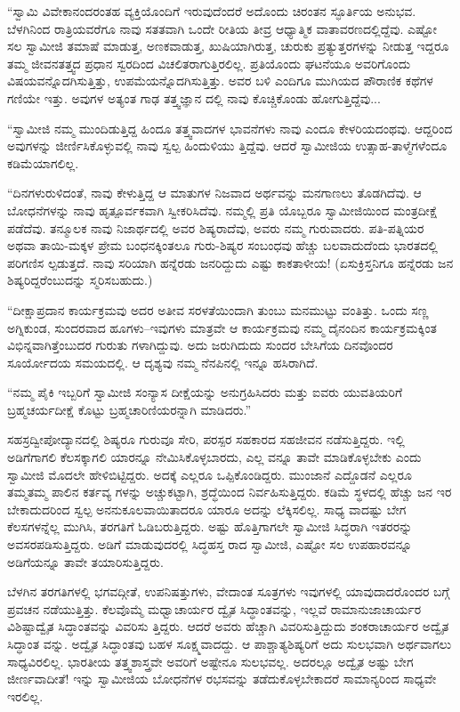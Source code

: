 “ಸ್ವಾಮಿ ವಿವೇಕಾನಂದರಂತಹ ವ್ಯಕ್ತಿಯೊಂದಿಗೆ ಇರುವುದೆಂದರೆ ಅದೊಂದು ಚಿರಂತನ ಸ್ಫೂರ್ತಿಯ ಅನುಭವ. ಬೆಳಗಿನಿಂದ ರಾತ್ರಿಯವರೆಗೂ ನಾವು ಸತತವಾಗಿ ಒಂದೇ ರೀತಿಯ ತೀವ್ರ ಆಧ್ಯಾತ್ಮಿಕ ವಾತಾವರಣದಲ್ಲಿದ್ದೆವು. ಎಷ್ಟೋ ಸಲ ಸ್ವಾಮೀಜಿ ತಮಾಷೆ ಮಾಡುತ್ತ, ಅಣಕವಾಡುತ್ತ, ಖುಷಿಯಾಗಿರುತ್ತ, ಚುರುಕು ಪ್ರತ್ಯುತ್ತರಗಳನ್ನು ನೀಡುತ್ತ ಇದ್ದರೂ ತಮ್ಮ ಜೀವನತತ್ತ್ವದ ಪ್ರಧಾನ ಸ್ವರದಿಂದ ವಿಚಲಿತರಾಗುತ್ತಿರಲಿಲ್ಲ. ಪ್ರತಿಯೊಂದು ಘಟನೆಯೂ ಅವರಿಗೊಂದು ವಿಷಯವನ್ನೊದಗಿಸುತ್ತಿತ್ತು, ಉಪಮೆಯನ್ನೊದಗಿಸುತ್ತಿತ್ತು. ಅವರ ಬಳಿ ಎಂದಿಗೂ ಮುಗಿಯದ ಪೌರಾಣಿಕ ಕಥೆಗಳ ಗಣಿಯೇ ಇತ್ತು. ಅವುಗಳ ಅತ್ಯಂತ ಗಾಢ ತತ್ತ್ವಜ್ಞಾನ ದಲ್ಲಿ ನಾವು ಕೊಚ್ಚಿಕೊಂಡು ಹೋಗುತ್ತಿದ್ದೆವು... 

“ಸ್ವಾಮೀಜಿ ನಮ್ಮ ಮುಂದಿಡುತ್ತಿದ್ದ ಹಿಂದೂ ತತ್ತ್ವವಾದಗಳ ಭಾವನೆಗಳು ನಾವು ಎಂದೂ ಕೇಳರಿಯದಂಥವು. ಆದ್ದರಿಂದ ಅವುಗಳನ್ನು ಜೀರ್ಣಿಸಿಕೊಳ್ಳುವಲ್ಲಿ ನಾವು ಸ್ವಲ್ಪ ಹಿಂದುಳಿಯು ತ್ತಿದ್ದೆವು. ಆದರೆ ಸ್ವಾಮೀಜಿಯ ಉತ್ಸಾಹ-ತಾಳ್ಮೆಗಳೆಂದೂ ಕಡಿಮೆಯಾಗಲಿಲ್ಲ.

“ದಿನಗಳುರುಳಿದಂತೆ, ನಾವು ಕೇಳುತ್ತಿದ್ದ ಆ ಮಾತುಗಳ ನಿಜವಾದ ಅರ್ಥವನ್ನು ಮನಗಾಣಲು ತೊಡಗಿದೆವು. ಆ ಬೋಧನೆಗಳನ್ನು ನಾವು ಹೃತ್ಪೂರ್ವಕವಾಗಿ ಸ್ವೀಕರಿಸಿದೆವು. ನಮ್ಮಲ್ಲಿ ಪ್ರತಿ ಯೊಬ್ಬರೂ ಸ್ವಾಮೀಜಿಯಿಂದ ಮಂತ್ರದೀಕ್ಷೆ ಪಡೆದೆವು. ತನ್ಮೂಲಕ ನಾವು ನಿಜಾರ್ಥದಲ್ಲಿ ಅವರ ಶಿಷ್ಯರಾದೆವು, ಅವರು ನಮ್ಮ ಗುರುವಾದರು. ಪತಿ-ಪತ್ನಿಯರ ಅಥವಾ ತಾಯಿ-ಮಕ್ಕಳ ಪ್ರೇಮ ಬಂಧನಕ್ಕಿಂತಲೂ ಗುರು-ಶಿಷ್ಯರ ಸಂಬಂಧವು ಹೆಚ್ಚು ಬಲವಾದುದೆಂದು ಭಾರತದಲ್ಲಿ ಪರಿಗಣಿಸ ಲ್ಪಡುತ್ತದೆ. ನಾವು ಸರಿಯಾಗಿ ಹನ್ನೆರಡು ಜನರಿದ್ದುದು ಎಷ್ಟು ಕಾಕತಾಳೀಯ! (ಏಸುಕ್ರಿಸ್ತನಿಗೂ ಹನ್ನೆರಡು ಜನ ಶಿಷ್ಯರಿದ್ದರೆಂಬುದನ್ನು ಸ್ಮರಿಸಬಹುದು.)

“ದೀಕ್ಷಾಪ್ರದಾನ ಕಾರ್ಯಕ್ರಮವು ಅದರ ಅತೀವ ಸರಳತೆಯಿಂದಾಗಿ ತುಂಬು ಮನಮುಟ್ಟು ವಂತಿತ್ತು. ಒಂದು ಸಣ್ಣ ಅಗ್ನಿಕುಂಡ, ಸುಂದರವಾದ ಹೂಗಳು–ಇವುಗಳು ಮಾತ್ರವೇ ಆ ಕಾರ್ಯಕ್ರಮವು ನಮ್ಮ ದೈನಂದಿನ ಕಾರ್ಯಕ್ರಮಕ್ಕಿಂತ ವಿಭಿನ್ನವಾಗಿತ್ತೆಂಬುದರ ಗುರುತು ಗಳಾಗಿದ್ದುವು. ಅದು ಜರುಗಿದುದು ಸುಂದರ ಬೇಸಿಗೆಯ ದಿನವೊಂದರ ಸೂರ್ಯೋದಯ ಸಮಯದಲ್ಲಿ. ಆ ದೃಶ್ಯವು ನಮ್ಮ ನೆನಪಿನಲ್ಲಿ ಇನ್ನೂ ಹಸಿರಾಗಿದೆ.

“ನಮ್ಮ ಪೈಕಿ ಇಬ್ಬರಿಗೆ ಸ್ವಾಮೀಜಿ ಸಂನ್ಯಾಸ ದೀಕ್ಷೆಯನ್ನು ಅನುಗ್ರಹಿಸಿದರು ಮತ್ತು ಐವರು ಯುವತಿಯರಿಗೆ ಬ್ರಹ್ಮಚರ್ಯದೀಕ್ಷೆ ಕೊಟ್ಟು ಬ್ರಹ್ಮಚಾರಿಣಿಯರನ್ನಾಗಿ ಮಾಡಿದರು.”

ಸಹಸ್ರದ್ವೀಪೋದ್ಯಾನದಲ್ಲಿ ಶಿಷ್ಯರೂ ಗುರುವೂ ಸೇರಿ, ಪರಸ್ಪರ ಸಹಕಾರದ ಸಹಜೀವನ ನಡೆಸುತ್ತಿದ್ದರು. ಇಲ್ಲಿ ಅಡಿಗೆಗಾಗಲಿ ಕೆಲಸಕ್ಕಾಗಲಿ ಯಾರನ್ನೂ ನೇಮಿಸಿಕೊಳ್ಳಬಾರದು, ಎಲ್ಲ ವನ್ನೂ ತಾವೇ ಮಾಡಿಕೊಳ್ಳಬೇಕು ಎಂದು ಸ್ವಾಮೀಜಿ ಮೊದಲೇ ಹೇಳಿಬಿಟ್ಟಿದ್ದರು. ಅದಕ್ಕೆ ಎಲ್ಲರೂ ಒಪ್ಪಿಕೊಂಡಿದ್ದರು. ಮುಂಜಾನೆ ಎದ್ದೊಡನೆ ಎಲ್ಲರೂ ತಮ್ಮತಮ್ಮ ಪಾಲಿನ ಕರ್ತವ್ಯ ಗಳನ್ನು ಅಚ್ಚುಕಟ್ಟಾಗಿ, ಶ್ರದ್ಧೆಯಿಂದ ನಿರ್ವಹಿಸುತ್ತಿದ್ದರು. ಕಡಿಮೆ ಸ್ಥಳದಲ್ಲಿ ಹೆಚ್ಚು ಜನ ಇರ ಬೇಕಾದುದರಿಂದ ಸ್ವಲ್ಪ ಅನನುಕೂಲವಾಯಿತಾದರೂ ಯಾರೂ ಅದನ್ನು ಲೆಕ್ಕಿಸಲಿಲ್ಲ. ಸಾಧ್ಯ ವಾದಷ್ಟು ಬೇಗ ಕೆಲಸಗಳನ್ನೆಲ್ಲ ಮುಗಿಸಿ, ತರಗತಿಗೆ ಓಡಿಬರುತ್ತಿದ್ದರು. ಅಷ್ಟು ಹೊತ್ತಿಗಾಗಲೇ ಸ್ವಾಮೀಜಿ ಸಿದ್ಧರಾಗಿ ಇತರರನ್ನು ಅವಸರಪಡಿಸುತ್ತಿದ್ದರು. ಅಡಿಗೆ ಮಾಡುವುದರಲ್ಲಿ ಸಿದ್ಧಹಸ್ತ ರಾದ ಸ್ವಾಮೀಜಿ, ಎಷ್ಟೋ ಸಲ ಉಪಹಾರವನ್ನೂ ಅಡಿಗೆಯನ್ನೂ ತಾವೇ ತಯಾರಿಸುತ್ತಿದ್ದರು.

ಬೆಳಗಿನ ತರಗತಿಗಳಲ್ಲಿ ಭಗವದ್ಗೀತೆ, ಉಪನಿಷತ್ತುಗಳು, ವೇದಾಂತ ಸೂತ್ರಗಳು ಇವುಗಳಲ್ಲಿ ಯಾವುದಾದರೊಂದರ ಬಗ್ಗೆ ಪ್ರವಚನ ನಡೆಯುತ್ತಿತ್ತು. ಕೆಲವೊಮ್ಮೆ ಮಧ್ವಾಚಾರ್ಯರ ದ್ವೈತ ಸಿದ್ಧಾಂತವನ್ನು, ಇಲ್ಲವೆ ರಾಮಾನುಜಾಚಾರ್ಯರ ವಿಶಿಷ್ಟಾದ್ವೈತ ಸಿದ್ಧಾಂತವನ್ನು ವಿವರಿಸು ತ್ತಿದ್ದರು. ಆದರೆ ಅವರು ಹೆಚ್ಚಾಗಿ ವಿವರಿಸುತ್ತಿದ್ದುದು ಶಂಕರಾಚಾರ್ಯರ ಅದ್ವೈತ ಸಿದ್ಧಾಂತ ವನ್ನು. ಅದ್ವೈತ ಸಿದ್ಧಾಂತವು ಬಹಳ ಸೂಕ್ಷ್ಮವಾದದ್ದು. ಆ ಪಾಶ್ಚಾತ್ಯಶಿಷ್ಯರಿಗೆ ಅದು ಸುಲಭವಾಗಿ ಅರ್ಥವಾಗಲು ಸಾಧ್ಯವಿರಲಿಲ್ಲ. ಭಾರತೀಯ ತತ್ತ್ವಶಾಸ್ತ್ರವೇ ಅವರಿಗೆ ಅಷ್ಟೇನೂ ಸುಲಭವಲ್ಲ. ಅದರಲ್ಲೂ ಅದ್ವೈತ ಅಷ್ಟು ಬೇಗ ಜೀರ್ಣವಾದೀತೆ! ಇನ್ನು ಸ್ವಾಮೀಜಿಯ ಬೋಧನೆಗಳ ರಭಸವನ್ನು ತಡೆದುಕೊಳ್ಳಬೇಕಾದರೆ ಸಾಮಾನ್ಯರಿಂದ ಸಾಧ್ಯವೇ ಇರಲಿಲ್ಲ.

